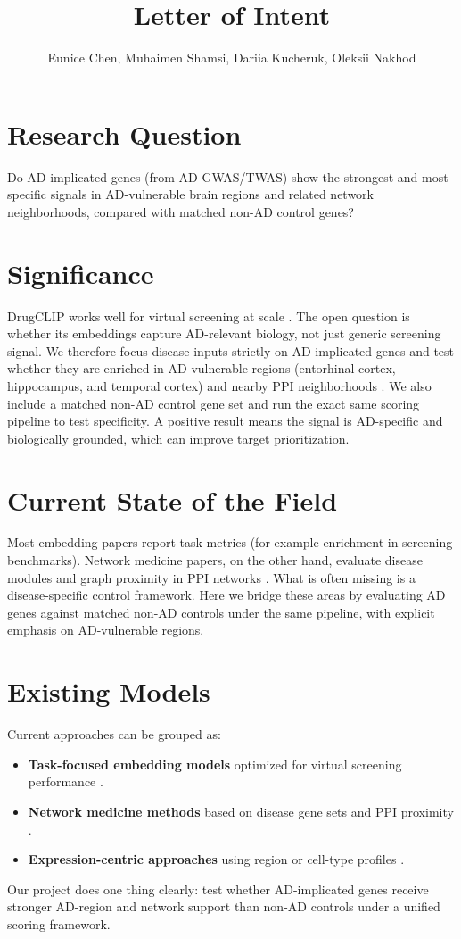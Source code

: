 \documentclass{article}
\title{Letter of Intent}
\author{Eunice Chen, Muhaimen Shamsi, Dariia Kucheruk, Oleksii Nakhod}
\begin{document}
\maketitle

\section{Research Question}
Do AD-implicated genes (from AD GWAS/TWAS) show the strongest and most specific
signals in AD-vulnerable brain regions and related network neighborhoods, compared
with matched non-AD control genes?

\section{Significance}
DrugCLIP works well for virtual screening at scale \cite{adGwas2025}. The open question is whether its embeddings capture AD-relevant biology, not just generic screening signal. We therefore focus disease inputs strictly on AD-implicated genes and test whether they are enriched in AD-vulnerable regions (entorhinal cortex, hippocampus, and temporal cortex) and nearby PPI neighborhoods \cite{aiNetworkMedicine2025}. We also include a matched non-AD control gene set and run the exact same scoring pipeline to test specificity. A positive result means the signal is AD-specific and biologically grounded, which can improve target prioritization.

\section{Current State of the Field}
Most embedding papers report task metrics (for example enrichment in screening benchmarks). Network medicine papers, on the other hand, evaluate disease modules and graph proximity in PPI networks \cite{string2018, string2019}. What is often missing is a disease-specific control framework. Here we bridge these areas by evaluating AD genes against matched non-AD controls under the same pipeline, with explicit emphasis on AD-vulnerable regions.

\section{Existing Models}
Current approaches can be grouped as:
\begin{itemize}
    \item \textbf{Task-focused embedding models} optimized for virtual screening performance \cite{adGwas2025}.
    \item \textbf{Network medicine methods} based on disease gene sets and PPI proximity \cite{string2018}.
    \item \textbf{Expression-centric approaches} using region or cell-type profiles \cite{allenAtlas2012, seaad2024}.
\end{itemize}
Our project does one thing clearly: test whether AD-implicated genes receive stronger AD-region and network support than non-AD controls under a unified scoring framework.
\end{document}
